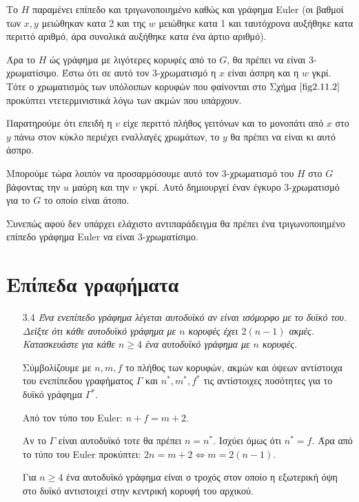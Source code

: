 \documentclass[a4paper, oneside, 11pt]{article}
\theoremstyle{definition}
\begin{document}
\begin{enumerate}
\begin{itemize}
\begin{itemize}
            Το $H$ παραμένει επίπεδο και τριγωνοποιημένο καθώς και γράφημα
            Euler (οι βαθμοί των $x, y$ μειώθηκαν κατα 2 και της $w$ μειώθηκε
            κατα 1 και ταυτόχρονα αυξήθηκε κατα περιττό αριθμό, άρα συνολικά
            αυξήθηκε κατα ένα άρτιο αριθμό).

            Άρα το $H$ ώς γράφημα με λιγότερες κορυφές από το $G$,
            θα πρέπει να είναι 3-χρωματίσιμο. Έστω ότι σε αυτό τον
            3-χρωματισμό η $x$ είναι άσπρη και η $w$ γκρί. Τότε
            ο χρωματισμός των υπόλοιπων κορυφών που φαίνονται στο
            Σχήμα $\ref{fig2.11.2}$ προκύπτει ντετερμινιστικά λόγω
            των ακμών που υπάρχουν.

            Παρατηρούμε ότι επειδή η $v$ είχε περιττό πλήθος γειτόνων και
            το μονοπάτι από $x$ στο $y$ πάνω στον κύκλο περιέχει εναλλαγές
            χρωμάτων, το $y$ θα πρέπει να είναι κι αυτό άσπρο.

            Μπορούμε τώρα λοιπόν να προσαρμόσουμε αυτό τον 3-χρωματισμό
            του $H$ στο $G$ βάφοντας την $u$ μαύρη και την $v$ γκρί. Αυτό
            δημιουργεί έναν έγκυρο 3-χρωματισμό για το $G$ το οποίο
            είναι άτοπο.
      \end{itemize}
      Συνεπώς αφού δεν υπάρχει ελάχιστο αντιπαράδειγμα θα πρέπει ένα
      τριγωνοποιημένο επίπεδο γράφημα Euler να είναι 3-χρωματίσιμο.
   \end{itemize}
\end{enumerate}

\section{Επίπεδα γραφήματα}

\begin{enumerate}
   \item[3.4] \emph{Ένα ενεπίπεδο γράφημα λέγεται αυτοδυϊκό αν είναι ισόμορφο
   με το δυϊκό του. Δείξτε ότι κάθε αυτοδυϊκό γράφημα με $n$ κορυφές έχει
   $2(n-1)$ ακμές. Κατασκευάστε για κάθε $n \geq 4$ ένα αυτοδυϊκό γράφημα
   με $n$ κορυφές.}

   Σύμβολίζουμε με $n, m, f$ το πλήθος των κορυφών, ακμών και όψεων αντίστοιχα
   του ενεπίπεδου γραφήματος $\Gamma$ και $n^*, m^*, f^*$ τις αντίστοιχες
   ποσότητες για το δυϊκό γράφημα $\Gamma^*$.

   Από τον τύπο του Euler: $n + f = m + 2$.

   Αν το $\Gamma$ είναι αυτοδυϊκό τοτε θα πρέπει $n = n^*$. Ισχύει
   όμως ότι $n^* = f$. Άρα από το τύπο του Euler προκύπτει: $2n = m + 2
   \Leftrightarrow m = 2(n-1)$.

   Για $n \geq 4$ ένα αυτοδυϊκό γράφημα είναι ο τροχός στον οποίο
   η εξωτερική όψη στο δυϊκό αντιστοιχεί στην κεντρική κορυφή του
   αρχικού.
\end{enumerate}
\end{document}
